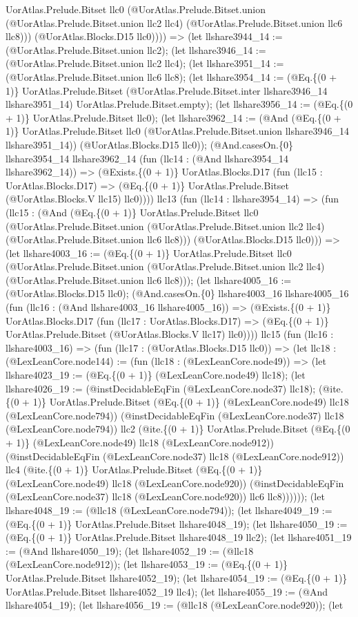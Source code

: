 \documentclass[11pt]{article}
\begin{document}
UorAtlas.Prelude.Bitset llc0 (@UorAtlas.Prelude.Bitset.union (@UorAtlas.Prelude.Bitset.union llc2 llc4) (@UorAtlas.Prelude.Bitset.union llc6 llc8))) (@UorAtlas.Blocks.D15 llc0)))) => (let llshare3944\_14 := (@UorAtlas.Prelude.Bitset.union llc2); (let llshare3946\_14 := (@UorAtlas.Prelude.Bitset.union llc2 llc4); (let llshare3951\_14 := (@UorAtlas.Prelude.Bitset.union llc6 llc8); (let llshare3954\_14 := (@Eq.\{(0 + 1)\} UorAtlas.Prelude.Bitset (@UorAtlas.Prelude.Bitset.inter llshare3946\_14 llshare3951\_14) UorAtlas.Prelude.Bitset.empty); (let llshare3956\_14 := (@Eq.\{(0 + 1)\} UorAtlas.Prelude.Bitset llc0); (let llshare3962\_14 := (@And (@Eq.\{(0 + 1)\} UorAtlas.Prelude.Bitset llc0 (@UorAtlas.Prelude.Bitset.union llshare3946\_14 llshare3951\_14)) (@UorAtlas.Blocks.D15 llc0)); (@And.casesOn.\{0\} llshare3954\_14 llshare3962\_14 (fun (llc14 : (@And llshare3954\_14 llshare3962\_14)) => (@Exists.\{(0 + 1)\} UorAtlas.Blocks.D17 (fun (llc15 : UorAtlas.Blocks.D17) => (@Eq.\{(0 + 1)\} UorAtlas.Prelude.Bitset (@UorAtlas.Blocks.V llc15) llc0)))) llc13 (fun (llc14 : llshare3954\_14) => (fun (llc15 : (@And (@Eq.\{(0 + 1)\} UorAtlas.Prelude.Bitset llc0 (@UorAtlas.Prelude.Bitset.union (@UorAtlas.Prelude.Bitset.union llc2 llc4) (@UorAtlas.Prelude.Bitset.union llc6 llc8))) (@UorAtlas.Blocks.D15 llc0))) => (let llshare4003\_16 := (@Eq.\{(0 + 1)\} UorAtlas.Prelude.Bitset llc0 (@UorAtlas.Prelude.Bitset.union (@UorAtlas.Prelude.Bitset.union llc2 llc4) (@UorAtlas.Prelude.Bitset.union llc6 llc8))); (let llshare4005\_16 := (@UorAtlas.Blocks.D15 llc0); (@And.casesOn.\{0\} llshare4003\_16 llshare4005\_16 (fun (llc16 : (@And llshare4003\_16 llshare4005\_16)) => (@Exists.\{(0 + 1)\} UorAtlas.Blocks.D17 (fun (llc17 : UorAtlas.Blocks.D17) => (@Eq.\{(0 + 1)\} UorAtlas.Prelude.Bitset (@UorAtlas.Blocks.V llc17) llc0)))) llc15 (fun (llc16 : llshare4003\_16) => (fun (llc17 : (@UorAtlas.Blocks.D15 llc0)) => (let llc18 : (@LexLeanCore.node144) := (fun (llc18 : (@LexLeanCore.node49)) => (let llshare4023\_19 := (@Eq.\{(0 + 1)\} (@LexLeanCore.node49) llc18); (let llshare4026\_19 := (@instDecidableEqFin (@LexLeanCore.node37) llc18); (@ite.\{(0 + 1)\} UorAtlas.Prelude.Bitset (@Eq.\{(0 + 1)\} (@LexLeanCore.node49) llc18 (@LexLeanCore.node794)) (@instDecidableEqFin (@LexLeanCore.node37) llc18 (@LexLeanCore.node794)) llc2 (@ite.\{(0 + 1)\} UorAtlas.Prelude.Bitset (@Eq.\{(0 + 1)\} (@LexLeanCore.node49) llc18 (@LexLeanCore.node912)) (@instDecidableEqFin (@LexLeanCore.node37) llc18 (@LexLeanCore.node912)) llc4 (@ite.\{(0 + 1)\} UorAtlas.Prelude.Bitset (@Eq.\{(0 + 1)\} (@LexLeanCore.node49) llc18 (@LexLeanCore.node920)) (@instDecidableEqFin (@LexLeanCore.node37) llc18 (@LexLeanCore.node920)) llc6 llc8)))))); (let llshare4048\_19 := (@llc18 (@LexLeanCore.node794)); (let llshare4049\_19 := (@Eq.\{(0 + 1)\} UorAtlas.Prelude.Bitset llshare4048\_19); (let llshare4050\_19 := (@Eq.\{(0 + 1)\} UorAtlas.Prelude.Bitset llshare4048\_19 llc2); (let llshare4051\_19 := (@And llshare4050\_19); (let llshare4052\_19 := (@llc18 (@LexLeanCore.node912)); (let llshare4053\_19 := (@Eq.\{(0 + 1)\} UorAtlas.Prelude.Bitset llshare4052\_19); (let llshare4054\_19 := (@Eq.\{(0 + 1)\} UorAtlas.Prelude.Bitset llshare4052\_19 llc4); (let llshare4055\_19 := (@And llshare4054\_19); (let llshare4056\_19 := (@llc18 (@LexLeanCore.node920)); (let 
\end{document}
